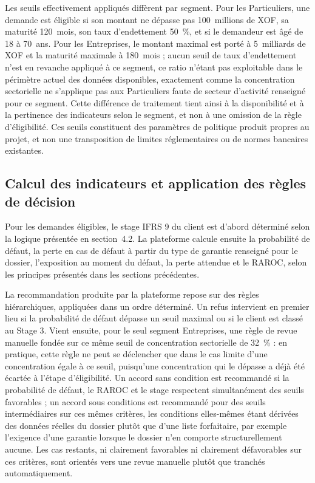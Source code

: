 Les seuils effectivement appliqués diffèrent par segment. Pour les Particuliers, une demande est éligible si son montant ne dépasse pas 100~millions de XOF, sa maturité 120~mois, son taux d'endettement 50~\%, et si le demandeur est âgé de 18 à 70~ans. Pour les Entreprises, le montant maximal est porté à 5~milliards de XOF et la maturité maximale à 180~mois ; aucun seuil de taux d'endettement n'est en revanche appliqué à ce segment, ce ratio n'étant pas exploitable dans le périmètre actuel des données disponibles, exactement comme la concentration sectorielle ne s'applique pas aux Particuliers faute de secteur d'activité renseigné pour ce segment. Cette différence de traitement tient ainsi à la disponibilité et à la pertinence des indicateurs selon le segment, et non à une omission de la règle d'éligibilité. Ces seuils constituent des paramètres de politique produit propres au projet, et non une transposition de limites réglementaires ou de normes bancaires existantes.

\subsection{Calcul des indicateurs et application des règles de décision}

Pour les demandes éligibles, le stage IFRS 9 du client est d'abord déterminé selon la logique présentée en section~4.2. La plateforme calcule ensuite la probabilité de défaut, la perte en cas de défaut à partir du type de garantie renseigné pour le dossier, l'exposition au moment du défaut, la perte attendue et le RAROC, selon les principes présentés dans les sections précédentes.

La recommandation produite par la plateforme repose sur des règles hiérarchiques, appliquées dans un ordre déterminé. Un refus intervient en premier lieu si la probabilité de défaut dépasse un seuil maximal ou si le client est classé au Stage 3. Vient ensuite, pour le seul segment Entreprises, une règle de revue manuelle fondée sur ce même seuil de concentration sectorielle de 32~\% : en pratique, cette règle ne peut se déclencher que dans le cas limite d'une concentration égale à ce seuil, puisqu'une concentration qui le dépasse a déjà été écartée à l'étape d'éligibilité. Un accord sans condition est recommandé si la probabilité de défaut, le RAROC et le stage respectent simultanément des seuils favorables ; un accord sous conditions est recommandé pour des seuils intermédiaires sur ces mêmes critères, les conditions elles-mêmes étant dérivées des données réelles du dossier plutôt que d'une liste forfaitaire, par exemple l'exigence d'une garantie lorsque le dossier n'en comporte structurellement aucune. Les cas restants, ni clairement favorables ni clairement défavorables sur ces critères, sont orientés vers une revue manuelle plutôt que tranchés automatiquement.

